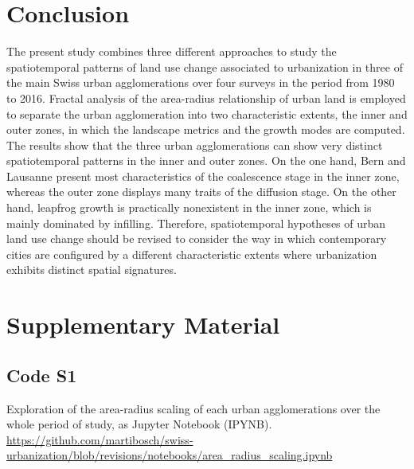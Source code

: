


\section*{Conclusion}

The present study combines three different approaches to study the spatiotemporal patterns of land use change associated to urbanization in three of the main Swiss urban agglomerations over four surveys in the period from 1980 to 2016.
Fractal analysis of the area-radius relationship of urban land is employed to separate the urban agglomeration into two characteristic extents, the inner and outer zones, in which the landscape metrics and the growth modes are computed.
The results show that the three urban agglomerations can show very distinct spatiotemporal patterns in the inner and outer zones. On the one hand, Bern and Lausanne present most characteristics of the coalescence stage in the inner zone, whereas the outer zone displays many traits of the diffusion stage. On the other hand, leapfrog growth is practically nonexistent in the inner zone, which is mainly dominated by infilling.
Therefore, spatiotemporal hypotheses of urban land use change should be revised to consider the way in which contemporary cities are configured by a different characteristic extents where urbanization exhibits distinct spatial signatures.


\section*{Supplementary Material}

\setcounter{figure}{0}
\renewcommand{\thefigure}{S\arabic{figure}}

\subsection*{Code S1}
\label{code-area-radius-scaling}
Exploration of the area-radius scaling of each urban agglomerations over the whole period of study, as Jupyter Notebook (IPYNB).
\url{https://github.com/martibosch/swiss-urbanization/blob/revisions/notebooks/area_radius_scaling.ipynb}

